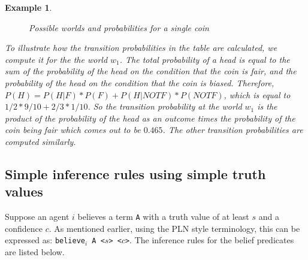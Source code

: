 \documentclass[12pt]{article}
\newtheorem{example}[theorem]{Example}
\begin{document}
\begin{example}
{\begin{figure}
\begin{center}
\caption{Possible worlds and probabilities for a single coin}
\label{fig:possiblewusc}
\end{center}
\end{figure}

To illustrate how the transition probabilities in the table are calculated, we compute it for the the world $w_1$. The total probability of a head is equal to the sum of the probability of the head on the condition that the coin is fair, and the probability of the head on the condition that the coin is biased. Therefore, $P(H) = P(H|F)*P(F) + P(H| NOT F)*P(NOT F)$, which is equal to $1/2*9/10 + 2/3*1/10$. So the transition probability at the world $w_1$ is the product of the probability of the head as an outcome times the probability of the coin being fair which comes out to be $0.465$. The other transition probabilities are computed similarly. }
\end{example}

\subsection{Simple inference rules using simple truth values}
Suppose an agent $i$ believes a term \texttt{A} with a truth value of at least $s$ and a confidence $c$. As mentioned earlier, using the PLN style terminology, this can be expressed as: \texttt{believe$_i$ A <$s$> <$c$>}. The inference rules for the belief predicates are listed below.
\end{document}
